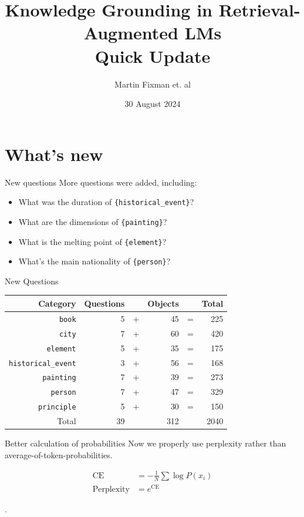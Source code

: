 \documentclass[9pt]{beamer}
\title{Knowledge Grounding in Retrieval-Augmented LMs \\ Quick Update}
\author{Martin Fixman et. al}
\institute{City, University of London}
\date{30 August 2024}
\begin{document}
\begin{frame}
	\titlepage{}
\end{frame}

\section{What's new}
\begin{frame}{New questions}
	More questions were added, including:

	\begin{itemize}
		\item What was the duration of \texttt{\{historical\_event\}}?
		\item What are the dimensions of \texttt{\{painting\}}?
		\item What is the melting point of \texttt{\{element\}}?
		\item What's the main nationality of \texttt{\{person\}}?
	\end{itemize}
\end{frame}

\begin{frame}{New Questions}
	\centering
	\begin{tabular}{r r c r c r}
		\toprule
		Category & Questions & & Objects & & Total \\
		\midrule
		\texttt{book} & 5 & + & 45 & = & 225 \\
		\texttt{city} & 7 & + & 60 & = & 420 \\
		\texttt{element} & 5 & + & 35 & = & 175 \\
		\texttt{historical\_event} & 3 & + & 56 & = & 168 \\
		\texttt{painting} & 7 & + & 39 & = & 273 \\
		\texttt{person} & 7 & + & 47 & = & 329 \\
		\texttt{principle} & 5 & + & 30 & = & 150 \\
		\midrule
		Total & 39 & & 312 & & 2040
		\bottomrule
	\end{tabular}
\end{frame}

\begin{frame}{Better calculation of probabilities}
	Now we properly use\footnotemark{} perplexity rather than average-of-token-probabilities.

	\begin{align*}
		\text{CE} &= - \frac{1}{N} \sum \log P(x_i) \\
		\text{Perplexity} &= e ^ {\text{CE}}
	\end{align*}

	\pause{}

	.
\end{frame}
\end{document}
